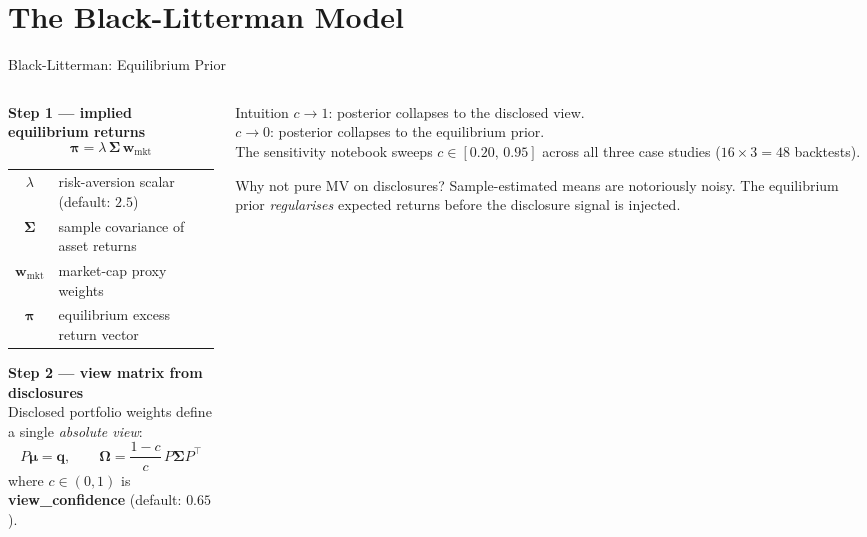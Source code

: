 \documentclass[aspectratio=169, 10pt]{beamer}
\begin{document}
\section{The Black-Litterman Model}

\begin{frame}{Black-Litterman: Equilibrium Prior}

  \begin{columns}[T]
    \begin{column}{0.52\textwidth}

      \textbf{Step 1 — implied equilibrium returns}
      \[
        \bm{\pi} = \lambda\,\bm{\Sigma}\,\bm{w}_{\text{mkt}}
      \]

      \medskip
      \begin{tabular}{@{}cl@{}}
        $\lambda$ & risk-aversion scalar (default: $2.5$) \\
        $\bm{\Sigma}$ & sample covariance of asset returns \\
        $\bm{w}_{\text{mkt}}$ & market-cap proxy weights \\[4pt]
        $\bm{\pi}$ & equilibrium excess return vector \\
      \end{tabular}

      \bigskip
      \textbf{Step 2 — view matrix from disclosures}\\[4pt]
      Disclosed portfolio weights define a single \emph{absolute view}:
      \[
        P\bm{\mu} = \bm{q}, \qquad
        \bm{\Omega} = \frac{1 - c}{c}\,P\bm{\Sigma}P^{\top}
      \]
      where $c \in (0,1)$ is \textbf{view\_confidence} (default: $0.65$).
    \end{column}

    \begin{column}{0.44\textwidth}
      \begin{block}{Intuition}
        \small
        $c \to 1$: posterior collapses to the disclosed view.\\[4pt]
        $c \to 0$: posterior collapses to the equilibrium prior.\\[4pt]
        The sensitivity notebook sweeps $c \in [0.20,\,0.95]$
        across all three case studies ($16 \times 3 = 48$ backtests).
      \end{block}

      \bigskip
      \begin{block}{Why not pure MV on disclosures?}
        \small
        Sample-estimated means are notoriously noisy.
        The equilibrium prior \emph{regularises} expected returns
        before the disclosure signal is injected.
      \end{block}
    \end{column}
  \end{columns}
\end{frame}
\end{document}
